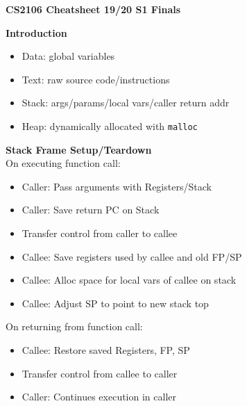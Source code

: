 \documentclass[a4paper, 12pt]{article}
\begin{document}
\setlength\parindent{0pt}
\setlength{\multicolsep}{1.0pt plus 2.0pt minus 1.5pt}%
\scriptsize
{}

\begin{center}
{\normalsize\textbf{CS2106 Cheatsheet 19/20 S1 Finals}}
\end{center}
\begin{multicols*}{4}
\noindent
{\small\textbf{Introduction}}
\begin{itemize}
	\item Data: global variables
	\item Text: raw source code/instructions
	\item Stack: args/params/local vars/caller return addr
	\item Heap: dynamically allocated with \texttt{malloc}
\end{itemize}
\textbf{Stack Frame Setup/Teardown} \\
On executing function call:
\begin{itemize}
    \item Caller: Pass arguments with Registers/Stack
    \item Caller: Save return PC on Stack
    \item Transfer control from caller to callee
    \item Callee: Save registers used by callee and old FP/SP
    \item Callee: Alloc space for local vars of callee on stack
    \item Callee: Adjust SP to point to new stack top
\end{itemize}
On returning from function call:
\begin{itemize}
    \item Callee: Restore saved Registers, FP, SP
    \item Transfer control from callee to caller
    \item Caller: Continues execution in caller
\end{itemize}

\medskip


\end{multicols*}
\end{document}
